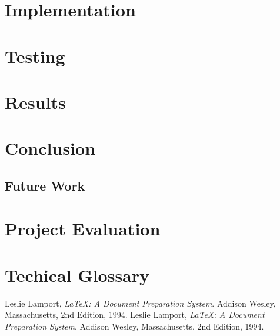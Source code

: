 \documentclass[12pt]{article}
\begin{document}
\section{Implementation}\label{implementation}
\section{Testing}\label{teting}
\section{Results}\label{results}
\section{Conclusion}\label{conclusion}
    \subsection{Future Work}\label{future}
\section{Project Evaluation}\label{evaluation}

\appendix
\section{Techical Glossary}\label{glossary}
    




\begin{thebibliography}{0}
     Leslie Lamport,
        \emph{\LaTeX: A Document Preparation System}.
        Addison Wesley, Massachusetts,
        2nd Edition,
        1994.
        Leslie Lamport,
        \emph{\LaTeX: A Document Preparation System}.
        Addison Wesley, Massachusetts,
        2nd Edition,
        1994.
\end{thebibliography}
\end{document}
